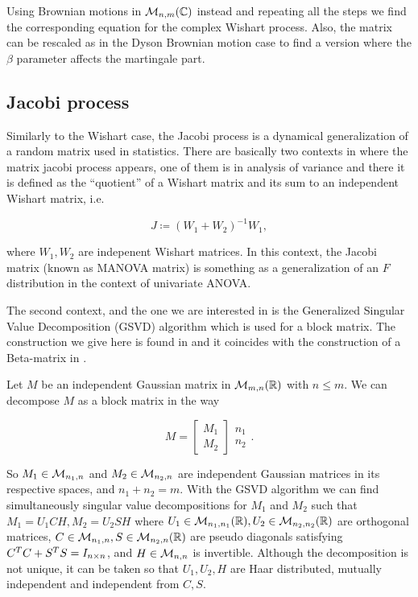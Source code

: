Using Brownian motions in $\mathcal M_{n,m}(\mathbb C)$ instead and repeating all the steps we find the corresponding equation for the complex Wishart process. Also, the matrix can be rescaled as in the Dyson Brownian motion case to find a version where the $\beta$ parameter affects the martingale part.

\subsection{Jacobi process}

Similarly to the Wishart case, the Jacobi process is a dynamical generalization of a random matrix used in statistics. There are basically two contexts in where the matrix jacobi process appears, one of them is in analysis of variance \cite{book:multivariate_statistics} and there it is defined as the ``quotient'' of a Wishart matrix and its sum to an independent Wishart matrix, i.e.

\begin{equation*}
    J \coloneqq (W_1 + W_2)^{-1}W_1,
\end{equation*}

\noindent where $W_1, W_2$ are indepenent Wishart matrices. In this context, the Jacobi matrix (known as MANOVA matrix) is something as a generalization of an $F$ distribution in the context of univariate ANOVA.

The second context, and the one we are interested in is the Generalized Singular Value Decomposition (GSVD) algorithm \cite{article:GSVD_van_loan} which is used for a block matrix. The construction we give here is found in \cite{article:marcus_finite_free_point_processes} and it coincides with the construction of a Beta-matrix in \cite{doumerc2005matrices}. 

Let $M$ be an independent Gaussian matrix in $\mathcal M_{m,n}(\mathbb R)$ with $n \le m$. We can decompose $M$ as a block matrix in the way

\begin{equation*}
    M = \begin{bmatrix} M_1 \\ M_2 \end{bmatrix} \begin{matrix} n_1 \\ n_2 \end{matrix}.
\end{equation*}

So $M_1 \in \mathcal M_{n_1,n}$ and $M_2 \in \mathcal M_{n_2,n}$ are independent Gaussian matrices in its respective spaces, and $n_1 + n_2 = m$. With the GSVD algorithm we can find simultaneously singular value decompositions for $M_1$ and $M_2$ such that $M_1 = U_1 CH, M_2 = U_2 S H$ where $U_1 \in \mathcal M_{n_1,n_1}(\mathbb R), U_2 \in \mathcal M_{n_2,n_2}(\mathbb R)$ are orthogonal matrices, $C\in \mathcal M_{n_1,n}, S \in \mathcal M_{n_2,n}(\mathbb R)$ are pseudo diagonals satisfying $C^TC + S^TS = I_{n\times n}$, and $H \in \mathcal M_{n,n}$ is invertible. Although the decomposition is not unique, it can be taken so that $U_1,U_2,H$ are Haar distributed, mutually independent and independent from $C,S$. 

